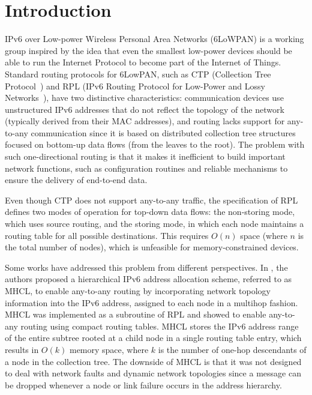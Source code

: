 \section{Introduction}

IPv6 over Low-power Wireless Personal Area Networks
(6LoWPAN) is a working group
inspired by the idea that even the smallest low-power devices should
be able to run the Internet Protocol to become part of the Internet
of Things. Standard routing protocols for 6LowPAN, such as CTP
(Collection Tree Protocol~\cite{Fonseca:2009}) and RPL (IPv6 Routing
Protocol for Low-Power and Lossy Networks~\cite{rfc6550}), have two
distinctive characteristics: communication devices use unstructured
IPv6 addresses that do not reflect the topology of the network
(typically derived from their MAC addresses), and routing lacks
support for any-to-any communication since it is based on
distributed collection tree structures focused on bottom-up data
flows (from the leaves to the root).
The problem with such one-directional routing is that it makes it
inefficient to build important network functions, such as
configuration routines and reliable mechanisms to ensure the
delivery of end-to-end data.

Even though CTP does not support any-to-any traffic, the specification of
RPL defines two modes of operation for top-down data flows: the non-storing
mode, which uses source routing, and the storing mode, in which each node
maintains a routing table for all possible destinations. This requires $O(n)$
space (where $n$ is the total number of nodes), which is unfeasible for
memory-constrained devices.

Some works have addressed this problem from different perspectives.
In \cite{2016techreport}, the authors proposed a hierarchical IPv6 address
allocation scheme, referred to as MHCL, to enable any-to-any routing
by incorporating network topology information into the IPv6 address,
assigned to each node in a multihop fashion. MHCL was implemented as
a subroutine of RPL and showed to enable any-to-any routing using
compact routing tables. MHCL stores the IPv6 address range of the
entire subtree rooted at a child node in a single routing table
entry, which results in $O(k)$ memory space, where $k$ is the number
of one-hop descendants of a node in the collection tree. The
downside of MHCL is that it was not designed to deal with network faults
and dynamic network topologies since a message can be dropped
whenever a node or link failure occurs in the address hierarchy.

